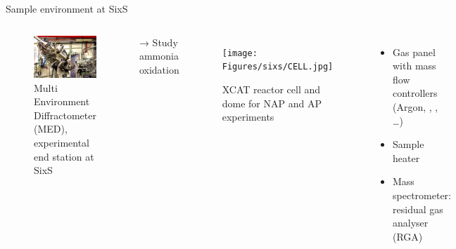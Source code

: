 \begin{frame}{Sample environment at SixS}

    \begin{columns}
    
            \begin{figure}
                \centering
                \captionsetup{width=\textwidth}
                \includegraphics[width=\textwidth]{Figures/sixs/MED.jpg}
                \caption{Multi Environment Diffractometer (MED), experimental end station at SixS}
                \label{fig:MED}
            \end{figure}

            → Study ammonia oxidation

            \pause
            \begin{figure}
                \centering
                \captionsetup{width=\textwidth}
                \texttt{[image: Figures/sixs/CELL.jpg]}
                \caption{XCAT reactor cell and dome for NAP and AP experiments}
                \label{fig:XCAT}
            \end{figure}

            \begin{itemize}
                \pause
                \item Gas panel with mass flow controllers (Argon, \ammonia, \dioxygen, …)
                \pause
                \item Sample heater
                \pause
                \item Mass spectrometer: residual gas analyser (RGA)
            \end{itemize}
            
    \end{columns}
\end{frame}